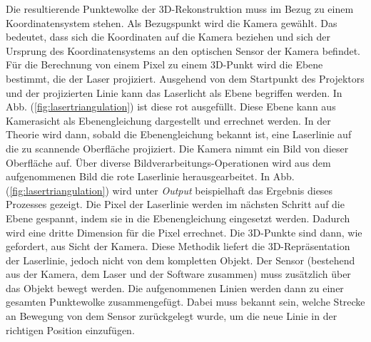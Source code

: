 	Die resultierende Punktewolke der 3D-Rekonstruktion muss im Bezug zu einem Koordinatensystem stehen. Als Bezugspunkt wird die Kamera gewählt. Das bedeutet, dass sich die Koordinaten auf die Kamera beziehen und sich der Ursprung des Koordinatensystems an den optischen Sensor der Kamera befindet. Für die Berechnung von einem Pixel zu einem 3D-Punkt wird die Ebene bestimmt, die der Laser projiziert. Ausgehend von dem Startpunkt des Projektors und der projizierten Linie kann das Laserlicht als Ebene begriffen werden. In Abb. (\ref{fig:lasertriangulation}) ist diese rot ausgefüllt. Diese Ebene kann aus Kamerasicht als Ebenengleichung dargestellt und errechnet werden. In der Theorie wird dann, sobald die Ebenengleichung bekannt ist, eine Laserlinie auf die zu scannende Oberfläche projiziert. Die Kamera nimmt ein Bild von dieser Oberfläche auf. Über diverse Bildverarbeitungs-Operationen wird aus dem aufgenommenen Bild die rote Laserlinie herausgearbeitet. In Abb. (\ref{fig:lasertriangulation}) wird unter \emph{Output} beispielhaft das Ergebnis dieses Prozesses gezeigt. Die Pixel der Laserlinie werden im nächsten Schritt auf die Ebene gespannt, indem sie in die Ebenengleichung eingesetzt werden. Dadurch wird eine dritte Dimension für die Pixel errechnet. Die 3D-Punkte sind dann, wie gefordert, aus Sicht der Kamera. Diese Methodik liefert die 3D-Repräsentation der Laserlinie, jedoch nicht von dem kompletten Objekt. Der Sensor (bestehend aus der Kamera, dem Laser und der Software zusammen) muss zusätzlich über das Objekt bewegt werden. Die aufgenommenen Linien werden dann zu einer gesamten Punktewolke zusammengefügt. Dabei muss bekannt sein, welche Strecke an Bewegung von dem Sensor zurückgelegt wurde, um die neue Linie in der richtigen Position einzufügen. 
